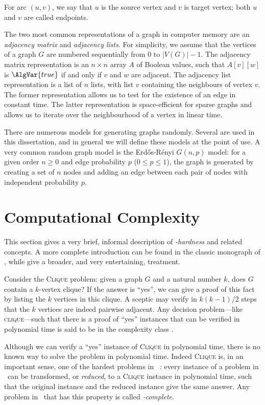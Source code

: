 For arc $(u,v)$, we say that $u$ is the source vertex and $v$ is target vertex; both
$u$ and $v$ are called endpoints.

The two most common representations of a graph in computer memory
are an \emph{adjacency matrix} and \emph{adjacency lists}.  For simplicity,
we assume that the vertices of a graph $G$ are numbered sequentially from
0 to $|V(G)| - 1$. The adjacency matrix representation is an $n \times n$
array $A$ of Boolean values, such that $A[v][w]$ is $\AlgVar{true}$ if and
only if $v$ and $w$ are adjacent.  The adjacency list representation
is a list of $n$ lists, with list $v$ containing the neighbours of vertex $v$.
The former representation allows us to test for the existence of an edge in constant
time.  The latter representation is space-efficient for sparse graphs
and allows us to iterate over the neighbourhood of a vertex in linear time.

There are numerous models for generating graphs randomly. Several are used
in this dissertation, and in general we will define these models at the point
of use.  A very common random graph model is the Erd\H{o}s-Rényi $G(n,p)$
model: for a given order $n \geq 0$ and edge probability $p$ ($0 \leq p \leq 1$),
the graph is generated by creating a set of $n$ nodes and adding an edge
between each pair of nodes with independent probability $p$.

\section{Computational Complexity}\label{sec:complexity}

This section gives a very brief, informal description of
\emph{\NP-hardness} and related concepts. A more complete introduction can be
found in the classic monograph of \citet{DBLP:books/fm/GareyJ79},
while \citet{moore2011nature} give a broader, and very entertaining,
treatment.

Consider the \textsc{Clique} problem: given a graph $G$ and a natural number $k$,
does $G$ contain a $k$-vertex clique?  If the answer is ``yes'', we can give a proof
of this fact by listing the $k$ vertices in this clique.  A sceptic may verify
in $k(k-1)/2$ steps that the $k$ vertices are indeed pairwise adjacent.  Any decision
problem---like \textsc{clique}---such that there is a proof of ``yes'' instances
that can be verified in polynomial time is said to be in the complexity class \NP.

Although we can verify a ``yes'' instance of \textsc{Clique} in polynomial
time, there is no known way to solve the problem in polynomial time.
Indeed \textsc{Clique} is, in an important sense, one of the hardest problems in \NP\
\citep{DBLP:conf/coco/Karp72}: every instance of a problem in \NP\ can be
transformed, or \emph{reduced}, to a \textsc{Clique} instance in polynomial
time, such that the original instance and the reduced instance give the same
answer.  Any problem in \NP\ that has this property is called \emph{\NP-complete}.

